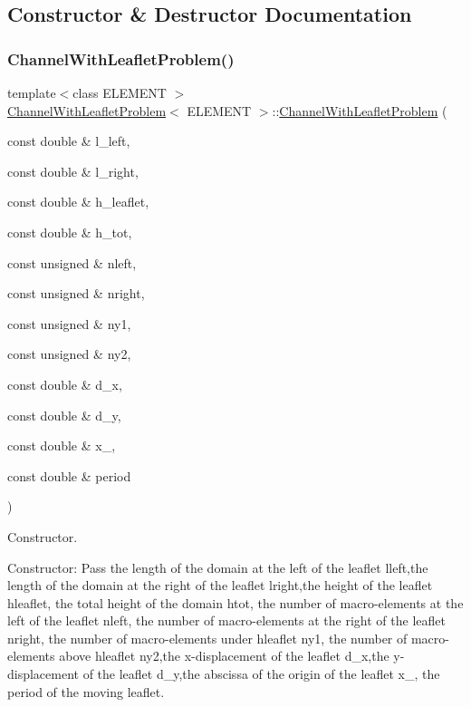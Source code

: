 \subsection{Constructor \& Destructor Documentation}
\mbox{\label{classChannelWithLeafletProblem_a3c5a4c97ec66fe53bc130005c74a47b5}} 
\subsubsection{\texorpdfstring{Channel\+With\+Leaflet\+Problem()}{ChannelWithLeafletProblem()}}
{\footnotesize\ttfamily template$<$class E\+L\+E\+M\+E\+NT $>$ \\
\hyperlink{classChannelWithLeafletProblem}{Channel\+With\+Leaflet\+Problem}$<$ E\+L\+E\+M\+E\+NT $>$\+::\hyperlink{classChannelWithLeafletProblem}{Channel\+With\+Leaflet\+Problem} (\begin{DoxyParamCaption}\item[{const double \&}]{l\+\_\+left,  }\item[{const double \&}]{l\+\_\+right,  }\item[{const double \&}]{h\+\_\+leaflet,  }\item[{const double \&}]{h\+\_\+tot,  }\item[{const unsigned \&}]{nleft,  }\item[{const unsigned \&}]{nright,  }\item[{const unsigned \&}]{ny1,  }\item[{const unsigned \&}]{ny2,  }\item[{const double \&}]{d\+\_\+x,  }\item[{const double \&}]{d\+\_\+y,  }\item[{const double \&}]{x\+\_,  }\item[{const double \&}]{period }\end{DoxyParamCaption})}



Constructor. 

Constructor\+: Pass the length of the domain at the left of the leaflet lleft,the length of the domain at the right of the leaflet lright,the height of the leaflet hleaflet, the total height of the domain htot, the number of macro-\/elements at the left of the leaflet nleft, the number of macro-\/elements at the right of the leaflet nright, the number of macro-\/elements under hleaflet ny1, the number of macro-\/elements above hleaflet ny2,the x-\/displacement of the leaflet d\+\_\+x,the y-\/displacement of the leaflet d\+\_\+y,the abscissa of the origin of the leaflet x\+\_, the period of the moving leaflet. 

